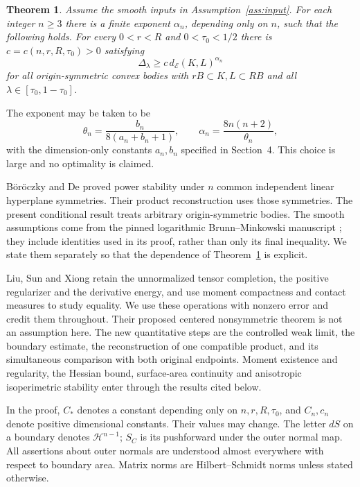 \documentclass[11pt,reqno]{amsart}
\numberwithin{equation}{section}
\newtheorem{theorem}{Theorem}[section]
\theoremstyle{remark}
\theoremstyle{definition}
\begin{document}
\begin{theorem}\label{thm:stability}
Assume the smooth inputs in Assumption~\ref{ass:input}. For each integer
$n\ge3$ there is a finite exponent $\alpha_n$, depending only on $n$,
such that the following holds. For every $0<r<R$ and
$0<\tau_0<1/2$ there is $c=c(n,r,R,\tau_0)>0$ satisfying
\begin{equation}\label{eq:stability}
 \Delta_\lambda\ge c\,d_{\mathcal E}(K,L)^{\alpha_n}
\end{equation}
for all origin-symmetric convex bodies with $rB\subset K,L\subset RB$
and all $\lambda\in[\tau_0,1-\tau_0]$.
\end{theorem}

The exponent may be taken to be
\begin{equation}\label{eq:exponent}
 \theta_n=\frac{b_n}{8(a_n+b_n+1)},\qquad
 \alpha_n=\frac{8n(n+2)}{\theta_n},
\end{equation}
with the dimension-only constants $a_n,b_n$ specified in Section~4.
This choice is large and no optimality is claimed.

B\"or\"oczky and De \cite{BD} proved power stability under $n$ common
independent linear hyperplane symmetries. Their product reconstruction
uses those symmetries. The present conditional result treats arbitrary
origin-symmetric bodies. The smooth assumptions come from the pinned
logarithmic Brunn--Minkowski manuscript \cite{OpenAI}; they include
identities used in its proof, rather than only its final inequality.
We state them separately so that the dependence of
Theorem~\ref{thm:stability} is explicit.

Liu, Sun and Xiong \cite{LSX} retain the unnormalized tensor completion,
the positive regularizer and the derivative energy, and use moment
compactness and contact measures to study equality. We use these
operations with nonzero error and credit them throughout. Their proposed
centered nonsymmetric theorem is not an assumption here. The new
quantitative steps are the controlled weak limit, the boundary estimate,
the reconstruction of one compatible product, and its simultaneous
comparison with both original endpoints. Moment existence and
regularity, the Hessian bound, surface-area continuity and anisotropic
isoperimetric stability enter through the results cited below.

In the proof, $C_*$ denotes a constant depending only on
$n,r,R,\tau_0$, and $C_n,c_n$ denote positive dimensional constants.
Their values may change. The letter $dS$ on a boundary denotes
$\mathcal H^{n-1}$; $S_C$ is its pushforward under the outer normal map.
All assertions about outer normals are understood almost everywhere
with respect to boundary area. Matrix norms are Hilbert--Schmidt norms
unless stated otherwise.
\end{document}
